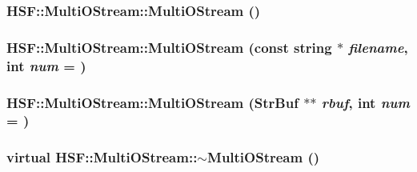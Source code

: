 \label{classHSF_1_1MultiOStream_ae743ac2c5f62bb631f10e0efdf45c0a5}
\hypertarget{classHSF_1_1MultiOStream_aa480e0d213e42b0c566a3dfb508910b6}{
\subsubsection[{MultiOStream}]{\setlength{\rightskip}{0pt plus 5cm}HSF::MultiOStream::MultiOStream ()}}
\label{classHSF_1_1MultiOStream_aa480e0d213e42b0c566a3dfb508910b6}
\hypertarget{classHSF_1_1MultiOStream_a438ace99909dfb8edeb030fee3e389fd}{
\subsubsection[{MultiOStream}]{\setlength{\rightskip}{0pt plus 5cm}HSF::MultiOStream::MultiOStream (const string $\ast$ {\em filename}, \/  int {\em num} = {})}}
\label{classHSF_1_1MultiOStream_a438ace99909dfb8edeb030fee3e389fd}
\hypertarget{classHSF_1_1MultiOStream_a4aac510e4c446ac42c8439cb436f84a1}{
\subsubsection[{MultiOStream}]{\setlength{\rightskip}{0pt plus 5cm}HSF::MultiOStream::MultiOStream ({\bf StrBuf} $\ast$$\ast$ {\em rbuf}, \/  int {\em num} = {})}}
\label{classHSF_1_1MultiOStream_a4aac510e4c446ac42c8439cb436f84a1}
\hypertarget{classHSF_1_1MultiOStream_ae743ac2c5f62bb631f10e0efdf45c0a5}{
\subsubsection[{$\sim$MultiOStream}]{\setlength{\rightskip}{0pt plus 5cm}virtual HSF::MultiOStream::$\sim$MultiOStream ()}}
\label{classHSF_1_1MultiOStream_ae743ac2c5f62bb631f10e0efdf45c0a5}



